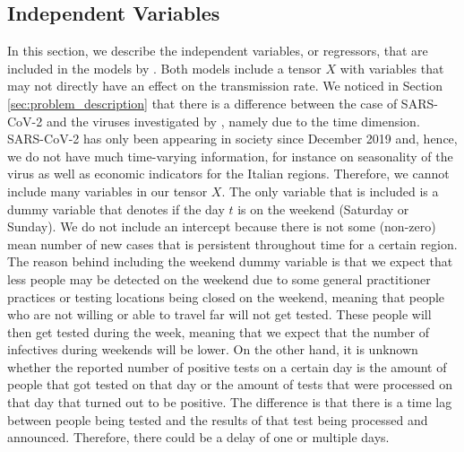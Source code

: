 \documentclass[12pt]{article}
\begin{document}
	\subsection{Independent Variables} \label{subsec:regressor_data}
	In this section, we describe the independent variables, or regressors, that are included in the models by \textcite{adda2016economic}. Both models include a tensor $X$ with variables that may not directly have an effect on the transmission rate. We noticed in Section \ref{sec:problem_description} that there is a difference between the case of SARS-CoV-2 and the viruses investigated by \textcite{adda2016economic}, namely due to the time dimension. SARS-CoV-2 has only been appearing in society since December 2019 and, hence, we do not have much time-varying information, for instance on seasonality of the virus as well as economic indicators for the Italian regions. Therefore, we cannot include many variables in our tensor $X$. The only variable that is included is a dummy variable that denotes if the day $t$ is on the weekend (Saturday or Sunday). We do not include an intercept because there is not some (non-zero) mean number of new cases that is persistent throughout time for a certain region. \\
	
	The reason behind including the weekend dummy variable is that we expect that less people may be detected on the weekend due to some general practitioner practices or testing locations being closed on the weekend, meaning that people who are not willing or able to travel far will not get tested. These people will then get tested during the week, meaning that we expect that the number of infectives during weekends will be lower. On the other hand, it is unknown whether the reported number of positive tests on a certain day is the amount of people that got tested on that day or the amount of tests that were processed on that day that turned out to be positive. The difference is that there is a time lag between people being tested and the results of that test being processed and announced. Therefore, there could be a delay of one or multiple days.
	
	
\end{document}
